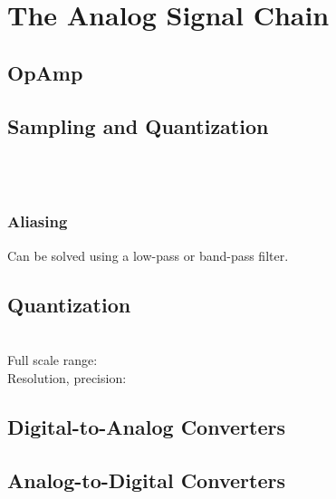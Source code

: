 \section{The Analog Signal Chain }
\subsection{OpAmp }
\subsection{Sampling and Quantization }
\\
\\

\subsubsection{Aliasing }

Can be solved using a low-pass or band-pass filter.

\subsection{Quantization}
\\
Full scale range: \\
Resolution, precision: \\

\subsection{Digital-to-Analog Converters }
\subsection{Analog-to-Digital Converters }